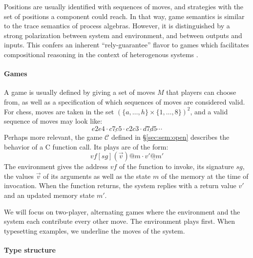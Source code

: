 \documentclass[sigplan,10pt,review,anonymous]{acmart}\settopmatter{printfolios=true,printccs=false,printacmref=false}
\newcommand{\kw}[1]{\ensuremath{ \mathsf{#1} }}
\begin{document}
Positions are usually identified with sequences of moves,
and strategies with the set of positions
a component could reach.
In that way,
game semantics is similar to
the trace semantics of process algebras.
However, it is distinguished
by a strong polarization between
system and environment,
and between outputs and inputs.
This confers an inherent ``rely-guarantee'' flavor
to games which facilitates compositional reasoning
in the context of heterogenous systems \cite{cspgs}.


\paragraph{Games} \label{sec:mainideas:gs:games} %

A game is usually defined by giving a set of moves $M$
that players can choose from,
as well as a specification of which
sequences of moves are considered valid.
For chess,
moves are taken in the set $(\{a, \ldots, h\} \times \{1, \ldots, 8\})^2$,
and a valid sequence of moves may look like:
\[ e2e4 \cdot \underline{c7c5} \cdot c2c3 \cdot \underline{d7d5} \cdots \]
Perhaps more relevant,
the game $\mathcal{C}$ defined in \S\ref{sec:sem:open}
describes the behavior of a C function call.
Its plays are of the form:
\[ \mathit{vf}[\mathit{sg}](\vec{v})@m \cdot \underline{v'@m'} \]
The environment gives the address $\mathit{vf}$
of the function to invoke,
its signature $\mathit{sg}$,
the values $\vec{v}$ of its arguments
as well as the state $m$ of the memory
at the time of invocation.
When the function returns,
the system replies with
a return value $v'$
and an updated memory state $m'$.

We will focus on two-player, alternating games
where the environment and the system each contribute every other move.
The environment plays first.
When typesetting examples,
we underline the moves of the system.



\paragraph{Type structure} \label{sec:mainideas:gs:types} %
\end{document}
